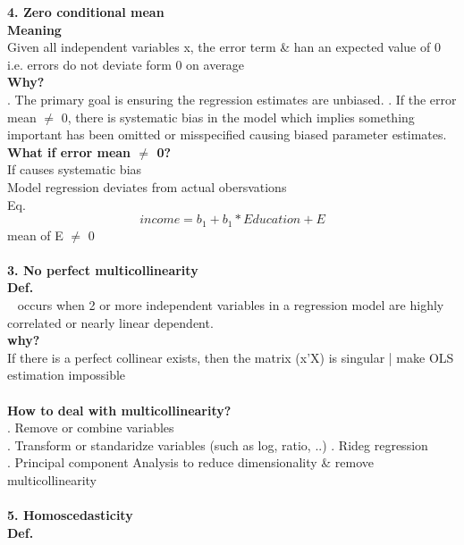 \documentclass{article}
\begin{document}
\indent \textbf{4. Zero conditional mean}\\
\indent \indent \textbf{Meaning}\\
\indent \indent \indent Given all independent variables x, the error term \& han an expected value of 0\\
\indent \indent \indent \indent i.e. errors do not deviate form 0 on average\\
\indent \indent \textbf{Why?}\\
\indent \indent {}. The primary goal is ensuring the regression estimates are unbiased.
\indent \indent {}. If the error mean $\neq$ 0, there is systematic bias in the model which implies something important has been omitted or misspecified causing biased parameter estimates.\\
\indent \indent \textbf{What if error mean $\neq$ 0?}\\
\indent \indent \indent * If causes systematic bias\\
\indent \indent \indent * Model regression deviates from actual obersvations\\
\indent \indent \indent \indent Eq. \[
income=b_1+b_1*Education+E\]
mean of E $\neq$ 0\\
\\
\indent \textbf{3. No perfect multicollinearity}\\
\indent \indent \textbf{Def.}\\
\indent \indent \indent ~ occurs when 2 or more independent variables in a regression model are highly correlated or nearly linear dependent.\\
\indent \indent \textbf{why?}\\
\indent \indent \indent If there  is a perfect collinear exists, then the matrix (x'X) is singular | make OLS estimation impossible\\
\\
\indent \indent \textbf{How to deal with multicollinearity?}\\
\indent \indent {}. Remove or combine variables\\
\indent \indent {}. Transform or standaridze variables (such as log, ratio, ..)
\indent \indent {}. Rideg regression\\
\indent \indent {}. Principal component Analysis to reduce dimensionality \& remove multicollinearity\\
\\
\indent \textbf{5. Homoscedasticity}\\
\indent \indent \textbf{Def.}\\
\end{document}
